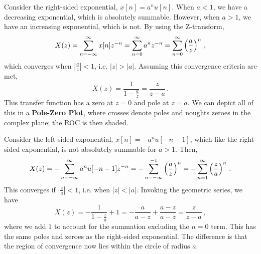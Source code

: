 \begin{exmp}
  Consider the right-sided exponential, $x[n] = a^n u[n]$. When $a<1$, we
  have a decreasing exponential, which is absolutely summable. However, when
  $a>1$, we have an increasing exponential, which is not. By using the
  Z-transform,
  \begin{displaymath}
    X(z) = \sum_{n=-\infty}^\infty x[n]z^{-n} = \sum_{n=0}^\infty a^n z^{-n}
    = \sum_{n=0}^\infty \left(\frac{a}{z}\right)^n \,,
  \end{displaymath}
  which converges when $\left|\frac{a}{z}\right| < 1$, i.e. $|z| > |a|$.
  Assuming this convergence criteria are met,
  \begin{displaymath}
    X(z) = \frac{1}{1 - \frac{a}{z}} = \frac{z}{z-a} \,.
  \end{displaymath}
  This transfer function has a zero at $z=0$ and pole at $z=a$. We can
  depict all of this in a \textbf{Pole-Zero Plot}, where crosses denote
  poles and noughts zeroes in the complex plane; the ROC is then shaded.
\end{exmp}
%
\begin{exmp}
  Consider the left-sided exponential, $x[n] = -a^n u[-n-1]$, which like
  the right-sided exponential, is not absolutely summable for $a>1$. Then,
  \begin{displaymath}
    X(z) = -\sum_{n=-\infty}^\infty a^n u[-n-1]z^{-n}
    = -\sum_{n=-\infty}^{-1}\left(\frac{a}{z}\right)^n
    = -\sum_{n=1}^{\infty}\left(\frac{z}{a}\right)^n \,.
  \end{displaymath}
  This converges if $\left|\frac{z}{a}\right| < 1$, i.e. when $|z| < |a|$.
  Invoking the geometric series, we have
  \begin{displaymath}
    X(z) = -\frac{1}{1 - \frac{z}{a}} + 1 = -\frac{a}{a - z} + \frac{a-z}{a - z}
    = \frac{z}{z-a} \,,
  \end{displaymath}
  where we add $1$ to account for the summation excluding the $n=0$ term. This
  has the same poles and zeroes as the right-sided exponential. The difference is
  that the region of convergence now lies within the circle of radius $a$.
\end{exmp}
%
